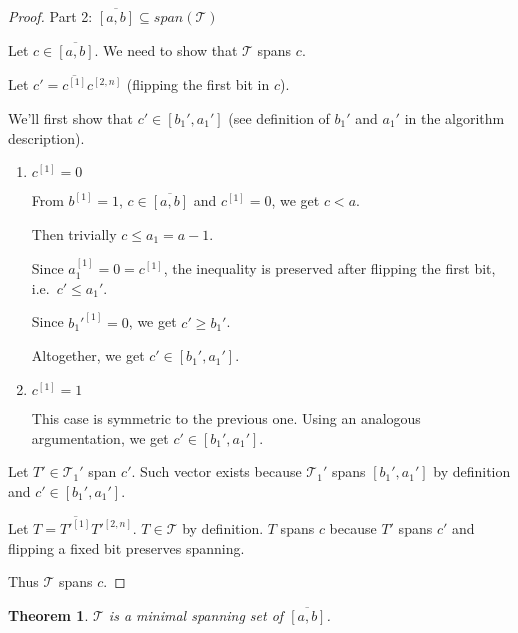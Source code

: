 \documentclass{article}
\theoremstyle{plain}
\newtheorem{theorem}{Theorem}[subsection]
\theoremstyle{definition}
\newcommand{\interval}[2]{[#1, #2]}
\newcommand{\compl}[1]{\overline{#1}}
\newcommand{\finterval}[2]{\compl{\interval{#1}{#2}}}
\newcommand{\bit}[2]{#1^{[#2]}}
\newcommand{\bits}[3]{#1^{\interval{#2}{#3}}}
\begin{document}
\begin{proof}
Part 2: $\finterval{a}{b} \subseteq span(\mathcal{T})$

Let $c \in \finterval{a}{b}$.
We need to show that $\mathcal{T}$ spans $c$.

Let $c' = \compl{\bit{c}{1}} \bits{c}{2}{n}$
(flipping the first bit in $c$).

We'll first show that $c' \in \interval{b_1'}{a_1'}$
(see definition of $b_1'$ and $a_1'$
in the algorithm description).

\begin{enumerate}
\item $\bit{c}{1} = 0$

From $\bit{b}{1} = 1$,
$c \in \finterval{a}{b}$
and $\bit{c}{1} = 0$,
we get $c < a$.

Then trivially $c \leq a_1 = a - 1$.

Since $\bit{a_1}{1} = 0 = \bit{c}{1}$,
the inequality is preserved after flipping the first bit,
i.e.~$c' \leq a_1'$.

Since $\bit{b_1'}{1} = 0$, we get $c' \geq b_1'$.

Altogether, we get $c' \in \interval{b_1'}{a_1'}$.
\item $\bit{c}{1} = 1$

This case is symmetric to the previous one.
Using an analogous argumentation,
we get $c' \in \interval{b_1'}{a_1'}$.
\end{enumerate}

Let $T' \in \mathcal{T}_1'$ span $c'$.
Such vector exists because
$\mathcal{T}_1'$ spans $\interval{b_1'}{a_1'}$
by definition
and $c' \in \interval{b_1'}{a_1'}$.

Let $T = \compl{\bit{T'}{1}} \bits{T'}{2}{n}$.
$T \in \mathcal{T}$ by definition.
$T$ spans $c$ because $T'$ spans $c'$
and flipping a fixed bit preserves spanning.

Thus $\mathcal{T}$ spans $c$.
\end{proof}

\begin{theorem}
$\mathcal{T}$ is a minimal spanning set of $\finterval{a}{b}$.
\end{theorem}
\end{document}
